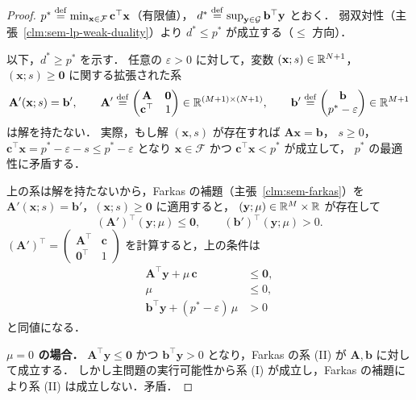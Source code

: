 \begin{proof}
  $p^* \overset{\mathrm{def}}{=} \min_{\mathbf{x} \in \mathcal{F}} \mathbf{c}^\top \mathbf{x}$（有限値），
  $d^* \overset{\mathrm{def}}{=} \sup_{\mathbf{y} \in \mathcal{G}} \mathbf{b}^\top \mathbf{y}$ とおく．
  弱双対性（主張~\ref{clm:sem-lp-weak-duality}）より $d^* \leq p^*$ が成立する（$\leq$ 方向）．

  以下，$d^* \geq p^*$ を示す．
  任意の $\varepsilon > 0$ に対して，変数 $(\mathbf{x}; s) \in \mathbb{R}^{N+1}$，
  $(\mathbf{x}; s) \geq \mathbf{0}$ に関する拡張された系
  \[
    \mathbf{A}' (\mathbf{x}; s) = \mathbf{b}',
    \qquad
    \mathbf{A}' \overset{\mathrm{def}}{=}
    \begin{pmatrix} \mathbf{A} & \mathbf{0} \\ \mathbf{c}^\top & 1 \end{pmatrix}
    \in \mathbb{R}^{(M+1)\times(N+1)},
    \qquad
    \mathbf{b}' \overset{\mathrm{def}}{=}
    \begin{pmatrix} \mathbf{b} \\ p^* - \varepsilon \end{pmatrix}
    \in \mathbb{R}^{M+1}
  \]
  は解を持たない．
  実際，もし解 $(\mathbf{x}, s)$ が存在すれば $\mathbf{A}\mathbf{x} = \mathbf{b}$，
  $s \geq 0$，$\mathbf{c}^\top \mathbf{x} = p^* - \varepsilon - s \leq p^* - \varepsilon$
  となり $\mathbf{x} \in \mathcal{F}$ かつ $\mathbf{c}^\top \mathbf{x} < p^*$ が成立して，
  $p^*$ の最適性に矛盾する．

  上の系は解を持たないから，Farkas の補題（主張~\ref{clm:sem-farkas}）を
  $\mathbf{A}' (\mathbf{x}; s) = \mathbf{b}'$，$(\mathbf{x}; s) \geq \mathbf{0}$ に適用すると，
  $(\mathbf{y}; \mu) \in \mathbb{R}^M \times \mathbb{R}$ が存在して
  \[
    (\mathbf{A}')^\top (\mathbf{y}; \mu) \leq \mathbf{0},
    \qquad
    (\mathbf{b}')^\top (\mathbf{y}; \mu) > 0.
  \]
  $(\mathbf{A}')^\top
    = \begin{pmatrix} \mathbf{A}^\top & \mathbf{c} \\ \mathbf{0}^\top & 1 \end{pmatrix}$
  を計算すると，上の条件は
  \begin{align*}
    \mathbf{A}^\top \mathbf{y} + \mu\,\mathbf{c} &\leq \mathbf{0}, \\
    \mu &\leq 0, \\
    \mathbf{b}^\top \mathbf{y} + (p^* - \varepsilon)\,\mu &> 0
  \end{align*}
  と同値になる．

  \textbf{$\mu = 0$ の場合．}
  $\mathbf{A}^\top \mathbf{y} \leq \mathbf{0}$ かつ $\mathbf{b}^\top \mathbf{y} > 0$
  となり，Farkas の系 (II) が $\mathbf{A}, \mathbf{b}$ に対して成立する．
  しかし主問題の実行可能性から系 (I) が成立し，Farkas の補題により系 (II) は成立しない．矛盾．


\end{proof}
